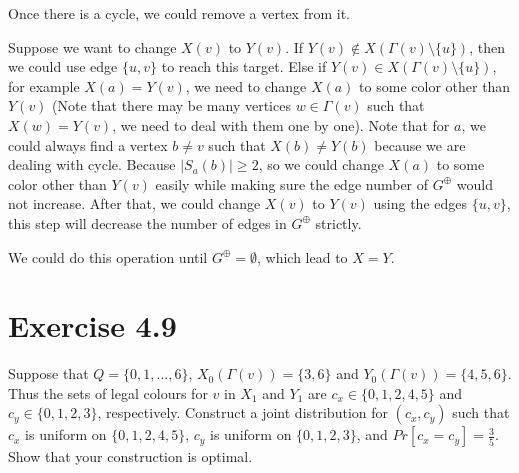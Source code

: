 \documentclass{article}
\begin{document}
\begin{tcolorbox}[title=Break cycles in $G^\oplus$]
  Once there is a cycle, we could remove a vertex from it.
  \begin{center}
  \end{center}
  \tcblower
  Suppose we want to change $X(v)$ to $Y(v)$. If $Y(v)\not\in X(\Gamma(v)\setminus\{u\})$, then we could use edge $\{u, v\}$ to reach this target. Else if $Y(v)\in X(\Gamma(v)\setminus\{u\})$, for example $X(a) = Y(v)$, we need to change $X(a)$ to some color other than $Y(v)$ (\textcolor[rgb]{0,0,1}{Note that there may be many vertices $w\in \Gamma(v)$ such that $X(w) = Y(v)$, we need to deal with them one by one}). Note that for $a$, we could always find a vertex $b\not=v$ such that $X(b)\not=Y(b)$ because we are dealing with cycle. Because $|S_a(b)| \geq 2$, so we could change $X(a)$ to some color other than $Y(v)$ easily while making sure the edge number of $G^\oplus$ would not increase. After that, we could change $X(v)$ to $Y(v)$ using the edges $\{u, v\}$, this step will decrease the number of edges in $G^\oplus$ strictly.
\end{tcolorbox}
We could do this operation until $G^\oplus = \emptyset$, which lead to $X = Y$.

\section{Exercise 4.9}
Suppose that $Q = \{0,1,...,6\}$, $X_0(\Gamma(v)) = \{3,6\}$ and $Y_0(\Gamma(v)) = \{4,5,6\}$. Thus the sets of legal colours for $v$ in $X_1$ and $Y_1$ are $c_x \in \{0,1,2,4,5\}$ and $c_y \in \{0, 1, 2, 3\}$, respectively. Construct a joint distribution for $(c_x, c_y)$ such that $c_x$ is uniform on $\{0,1,2,4,5\}$, $c_y$ is uniform on $\{0,1,2,3\}$, and $Pr[c_x = c_y] = \frac{3}{5}$. Show that your construction is optimal.
\end{document}
